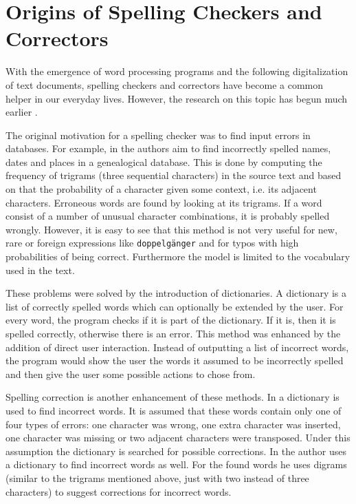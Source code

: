 \section{Origins of Spelling Checkers and Correctors}

With the emergence of word processing programs and the following digitalization of text documents, spelling checkers and correctors have become a common helper in our everyday lives. However, the research on this topic has begun much earlier \cite{program_check_correction}.

The original motivation for a spelling checker was to find input errors in databases. For example, in \cite{data_correction} the authors aim to find incorrectly spelled names, dates and places in a genealogical database. This is done by computing the frequency of trigrams (three sequential characters) in the source text and based on that the probability of a character given some context, i.e. its adjacent characters. Erroneous words are found by looking at its trigrams. If a word consist of a number of unusual character combinations, it is probably spelled wrongly. However, it is easy to see that this method is not very useful for new, rare or foreign expressions like \texttt{doppelg\"{a}nger} and for typos with high probabilities of being correct. Furthermore the model is limited to the vocabulary used in the text.

These problems were solved by the introduction of dictionaries. A dictionary is a list of correctly spelled words which can optionally be extended by the user. For every word, the program checks if it is part of the dictionary. If it is, then it is spelled correctly, otherwise there is an error. This method was enhanced by the addition of direct user interaction. Instead of outputting a list of incorrect words, the program would show the user the words it assumed to be incorrectly spelled and then give the user some possible actions to chose from.

Spelling correction is another enhancement of these methods. In \cite{dictionary_correction} a dictionary is used to find incorrect words. It is assumed that these words contain only one of four types of errors: one character was wrong, one extra character was inserted, one character was missing or two adjacent characters were transposed. Under this assumption the dictionary is searched for possible corrections. In \cite{digram_correction} the author uses a dictionary to find incorrect words as well. For the found words he uses digrams (similar to the trigrams mentioned above, just with two instead of three characters) to suggest corrections for incorrect words.

